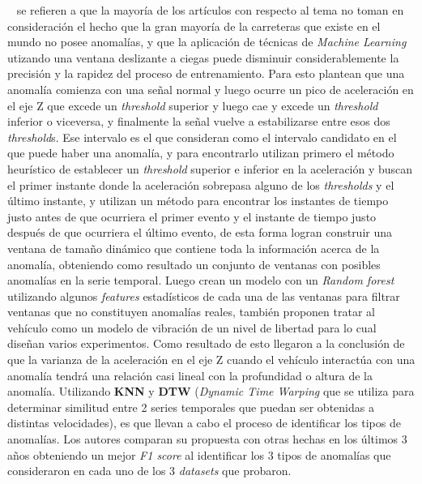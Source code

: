 		~ se refieren a que la mayoría de los artículos con respecto al tema no toman en consideración el hecho que la gran
		mayoría de la carreteras que existe en el mundo no posee anomalías, y que la aplicación de técnicas de \emph{Machine Learning} utizando una
		ventana deslizante a ciegas puede disminuir considerablemente la precisión y la rapidez del proceso de entrenamiento. Para esto plantean que
		una anomalía comienza con una señal normal y luego ocurre un pico de aceleración en el eje Z que excede un \emph{threshold} superior y luego
		cae y excede un \emph{threshold} inferior o viceversa, y finalmente la señal vuelve a estabilizarse entre esos dos \emph{threshold}s. Ese
		intervalo es el que consideran como el intervalo candidato en el que puede haber una anomalía, y para encontrarlo utilizan primero el método
		heurístico de establecer un \emph{threshold} superior e inferior en la aceleración y buscan el primer instante donde la aceleración sobrepasa
		alguno de los \emph{thresholds} y el último instante, y utilizan un método para encontrar los instantes de tiempo justo antes de que ocurriera
		el primer evento y el instante de tiempo justo después de que ocurriera el último evento, de esta forma logran construir una ventana de tamaño
		dinámico que contiene toda la información acerca de la anomalía, obteniendo como resultado un conjunto de ventanas con posibles anomalías en
		la serie temporal. Luego crean un modelo con un \emph{Random forest} utilizando algunos \emph{features} estadísticos de cada una de las ventanas
		para filtrar ventanas que no constituyen anomalías reales, también proponen tratar al vehículo como un modelo de vibración de un nivel de
		libertad para lo cual diseñan varios experimentos. Como resultado de esto llegaron a la conclusión de que la varianza de la aceleración en el
		eje Z cuando el vehículo interactúa con una anomalía tendrá una relación casi lineal con la profundidad o altura de la anomalía. Utilizando
		\textbf{KNN} y \textbf{DTW} (\emph{Dynamic Time Warping} que se utiliza para determinar similitud entre 2 series temporales que puedan ser
		obtenidas a distintas velocidades), es que llevan a cabo el proceso de identificar los tipos de anomalías. Los autores comparan su propuesta
		con otras hechas en los últimos 3 años obteniendo un mejor \emph{F1 score} al identificar los 3 tipos de anomalías que consideraron en cada
		uno de los 3 \emph{datasets} que probaron.\\

